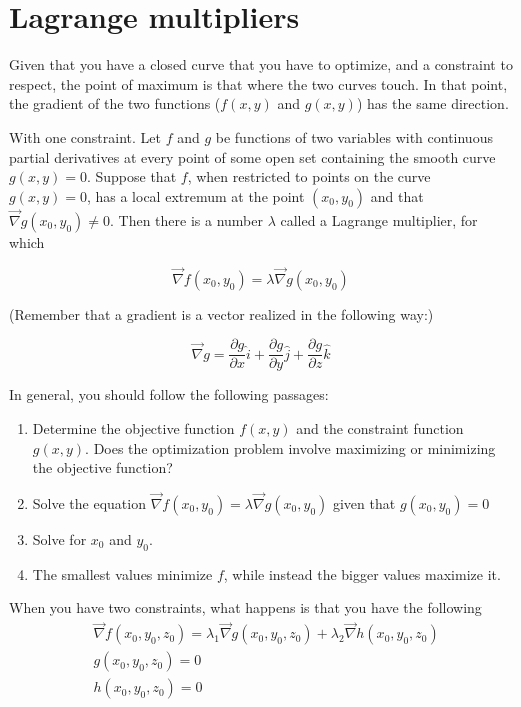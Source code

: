 \section{Lagrange multipliers}\label{chap: lagrange}

Given that you have a closed curve that you have to optimize, and a constraint to respect, the point of maximum is that where the two curves touch. In that point, the gradient of the two functions ($f(x, y)$ and $g(x, y)$) has the same direction.

With one constraint. Let  $f$ and  $g$ be functions of two variables with continuous partial derivatives at every point of some open set containing the smooth curve  $g(x,y)=0$. Suppose that  $f$, when restricted to points on the curve  $g(x,y)=0$, has a local extremum at the point $(x_0,y_0)$ and that  $\vec{\nabla} g(x_0, y_0) \neq 0$. Then there is a number  $\lambda$ called a Lagrange multiplier, for which

$$
\vec{\nabla} f(x_0, y_0) = \lambda \vec{\nabla} g(x_0, y_0)
$$

(Remember that a gradient is a vector realized in the following way:)

\begin{equation}\label{eq: gradient}
  \vec{\nabla} g = \frac{\partial g}{\partial x} \hat{i} + \frac{\partial g}{\partial y} \hat{j} + \frac{\partial g}{\partial z} \hat{k}
\end{equation}

In general, you should follow the following passages:
\begin{enumerate}
  \item Determine the objective function  $f(x,y)$ and the constraint function  $g(x,y)$. Does the optimization problem involve maximizing or minimizing the objective function?
  \item Solve the equation $\vec{\nabla} f(x_0, y_0) = \lambda \vec{\nabla} g(x_0, y_0)$ given that $g(x_0, y_0) = 0$
  \item Solve for $x_0$ and $y_0$.
  \item The smallest values minimize $f$, while instead the bigger values maximize it.
\end{enumerate}

When you have two constraints, what happens is that you have the following
\begin{align*}
  &\vec{\nabla} f(x_0, y_0, z_0) = \lambda_1 \vec{\nabla} g(x_0, y_0, z_0) + \lambda_2 \vec{\nabla} h(x_0, y_0, z_0) \\
  &g(x_0, y_0, z_0) = 0 \\
  &h(x_0, y_0, z_0) = 0
\end{align*}

